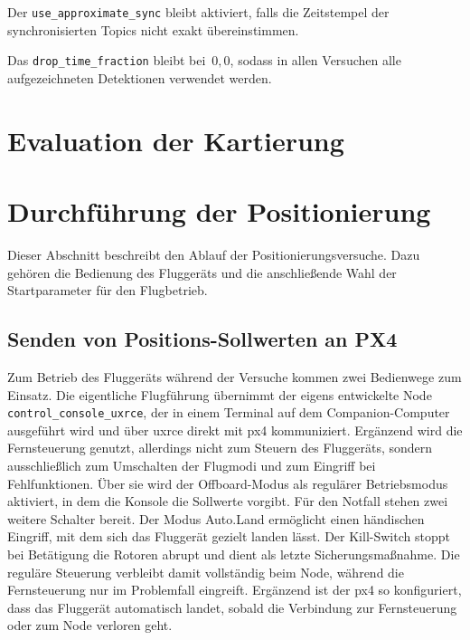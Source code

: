 Der \texttt{use\_approximate\_sync} bleibt aktiviert, falls die Zeitstempel der synchronisierten Topics nicht exakt übereinstimmen.

Das \texttt{drop\_time\_fraction} bleibt bei~$0{,}0$, sodass in allen Versuchen alle aufgezeichneten Detektionen verwendet werden.

\section{Evaluation der Kartierung}




\section{Durchführung der Positionierung}
Dieser Abschnitt beschreibt den Ablauf der Positionierungsversuche.
Dazu gehören die Bedienung des Fluggeräts und die anschließende Wahl der Startparameter für den Flugbetrieb.

\subsection{Senden von Positions-Sollwerten an PX4}
\label{sec:bedienkonsole}
Zum Betrieb des Fluggeräts während der Versuche kommen zwei Bedienwege zum Einsatz.
Die eigentliche Flugführung übernimmt der eigens entwickelte Node \texttt{control\_\allowbreak console\_\allowbreak uxrce}, der in einem Terminal auf dem Companion-Computer ausgeführt wird und über \gls{uxrce} direkt mit \gls{px4} kommuniziert.
Ergänzend wird die Fernsteuerung genutzt, allerdings nicht zum Steuern des Fluggeräts, sondern ausschließlich zum Umschalten der Flugmodi und zum Eingriff bei Fehlfunktionen.
Über sie wird der Offboard-Modus als regulärer Betriebsmodus aktiviert, in dem die Konsole die Sollwerte vorgibt.
Für den Notfall stehen zwei weitere Schalter bereit.
Der Modus Auto.Land ermöglicht einen händischen Eingriff, mit dem sich das Fluggerät gezielt landen lässt.
Der Kill-Switch stoppt bei Betätigung die Rotoren abrupt und dient als letzte Sicherungsmaßnahme.
Die reguläre Steuerung verbleibt damit vollständig beim Node, während die Fernsteuerung nur im Problemfall eingreift.
Ergänzend ist der \gls{px4} so konfiguriert, dass das Fluggerät automatisch landet, sobald die Verbindung zur Fernsteuerung oder zum Node verloren geht.

